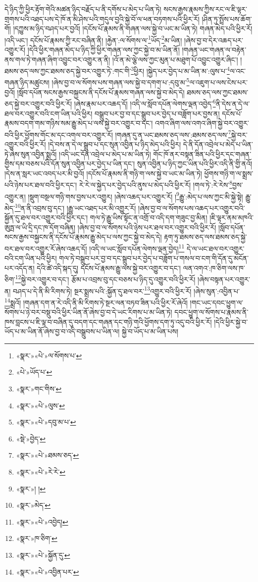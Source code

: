 དེ་ཉིད་ཀྱི་ཕྱིར་རྟོག་གེའི་མཚན་ཉིད་བརྗོད་པ་ནི་དགོས་པ་མེད་པ་ཡིན་ཏེ། སངས་རྒྱས་རྣམས་ཀྱིས་རང་ལ་ཇི་ལྟར་གྲགས་པའི་འཐད་པས་དེ་ཁོ་ན་མི་ཤེས་པའི་གདུལ་བྱའི་སྐྱེ་བོ་ལ་ཕན་བཏགས་པའི་ཕྱིར་རོ། །ཤིན་ཏུ་སྤྲོས་པས་ཆོག་གོ། །དཀྱུས་མ་ཉིད་བཤད་པར་བྱའོ། །དངོས་པོ་རྣམས་ནི་གཞན་ལས་སྐྱེ་བ་ཡང་མ་ཡིན་ཏེ། གཞན་མེད་པའི་ཕྱིར་རོ། །འདི་ཡང་། དངོས་པོ་རྣམས་ཀྱི་རང་བཞིན་ནི། །རྐྱེན་:ལ་སོགས་ལ་\footnote{«སྣར་»«པེ་»ལ་སོགས་པ་}ཡོད་\footnote{«པེ་»ཡོད་པ་}མ་ཡིན། །ཞེས་བྱ་བ་དེར་འཆད་པར་འགྱུར་རོ། །དེའི་ཕྱིར་གཞན་མེད་པ་ཉིད་ཀྱི་ཕྱིར་གཞན་ལས་ཀྱང་སྐྱེ་བ་མ་ཡིན་ནོ། །གཞན་ཡང་གཞན་ལ་བརྟེན་ནས་གལ་ཏེ་གཞན་ཞིག་འབྱུང་བར་འགྱུར་ན་ནི། །འོ་ན་མེ་ལྕེ་ལས་ཀྱང་མུན་པ་མཐུག་པོ་འབྱུང་འགྱུར་ཞིང་། །ཐམས་ཅད་ལས་ཀྱང་ཐམས་ཅད་སྐྱེ་བར་འགྱུར་ཏེ་:གང་གི་\footnote{«སྣར་»གང་གིས་}ཕྱིར། །སྐྱེད་པར་བྱེད་པ་མ་ཡིན་མ་:ལུས་པ་\footnote{«སྣར་»«པེ་»ལུས་}ལ་འང་གཞན་ཉིད་མཚུངས། །ཞེས་བྱ་བ་ལ་སོགས་པས་གཞན་ལས་སྐྱེ་བ་དགག་པ་:དབུ་མ་\footnote{«སྣར་»«པེ་»དབུ་མ་པ་}ལ་འཇུག་པ་ལས་ངེས་པར་བྱའོ། །སློབ་དཔོན་སངས་རྒྱས་བསྐྱངས་ནི་དངོས་པོ་རྣམས་གཞན་ལས་སྐྱེ་བ་མེད་དེ། ཐམས་ཅད་ལས་ཀྱང་ཐམས་ཅད་སྐྱེ་བར་འགྱུར་བའི་ཕྱིར་རོ། །ཞེས་རྣམ་པར་འཆད་དོ། །འདི་ལ་སློབ་དཔོན་ལེགས་ལྡན་འབྱེད་\footnote{«སྡེ་»བྱེད་}ནི་དེས་ན་དེ་ལ་ཐལ་བར་འགྱུར་བའི་ངག་ཡིན་པའི་ཕྱིར། བསྒྲུབ་པར་བྱ་བ་དང་སྒྲུབ་པར་བྱེད་པ་བཟློག་པར་བྱས་ན། དངོས་པོ་རྣམས་བདག་གམ་གཉིས་སམ་རྒྱུ་མེད་པ་ལས་སྐྱེ་བར་འགྱུར་བ་དང་། འགའ་ཞིག་ལས་འགའ་ཞིག་སྐྱེ་བར་འགྱུར་བའི་ཕྱིར་ཕྱོགས་གོང་མ་དང་འགལ་བར་འགྱུར་རོ། །གཞན་དུ་ན་ཡང་ཐམས་ཅད་ལས་:ཐམས་ཅད་ལས་\footnote{«སྣར་»«པེ་»ཐམས་ཅད་}སྐྱེ་བར་འགྱུར་བའི་ཕྱིར་རོ། །དེ་བས་ན་དེ་ལ་སྒྲུབ་པ་དང་སུན་འབྱིན་པ་ཉིད་མེད་པའི་ཕྱིར། དེ་ནི་དོན་འབྲེལ་པ་མེད་པ་ཡིན་ཏེ་ཞེས་སུན་འབྱིན་སྨྲའོ། །འདི་ཡང་དོན་འབྲེལ་པ་མེད་པ་མ་ཡིན་ཏེ། གོང་ཁོ་ནར་བསྟན་ཟིན་པའི་ཕྱིར་དང་གཞན་གྱིས་དམ་བཅས་པའི་དོན་སུན་འབྱིན་པར་བྱེད་པ་ཡིན་དང་། སུན་འབྱིན་པ་ཉིད་ཀྱང་ཡིན་པའི་ཕྱིར་འདི་ནི་གྱི་ནའོ། །དེས་ན་སླར་ཡང་འབད་པར་མི་བྱའོ། །དངོས་པོ་རྣམས་ནི་གཉི་ག་ལས་སྐྱེ་བ་ཡང་མ་ཡིན་ཏེ། ཕྱོགས་གཉི་ག་ལ་སྨྲས་པའི་ཉེས་པར་ཐལ་བའི་ཕྱིར་དང་། རེ་རེ་ལ་སྐྱེད་པར་བྱེད་པའི་ནུས་པ་མེད་པའི་ཕྱིར་རོ། །གལ་ཏེ་:རེ་རེས་\footnote{«སྣར་»«པེ་»རེ་རེ་}བྱས་འགྱུར་ན། །སྡུག་བསྔལ་གཉི་གས་བྱས་པར་འགྱུར། །ཞེས་འཆད་པར་འགྱུར་རོ། །\footnote{«སྣར་»། ། }རྒྱུ་:མེད་པ་ལས་ཀྱང་མི་སྐྱེ་སྟེ། རྒྱུ་མེད་\footnote{«སྣར་»མེད་}ན་ནི་འབྲས་བུ་དང་། །རྒྱུ་ཡང་འཐད་པར་མི་འགྱུར་རོ། །ཞེས་བྱ་བ་ལ་སོགས་པས་འཆད་པར་འགྱུར་བའི་སྐྱོན་དུ་ཐལ་བར་འགྱུར་བའི་ཕྱིར་དང་། གལ་ཏེ་རྒྱུ་ཡིས་སྟོང་ན་འགྲོ་བ་འདི་དག་གཟུང་བྱ་མིན། །ཇི་ལྟར་ནམ་མཁའི་ཨུཏྤ་ལ་ཡི་དྲི་དང་ཁ་དོག་བཞིན། །ཞེས་བྱ་བ་ལ་སོགས་པའི་ཉེས་པར་ཐལ་བར་འགྱུར་བའི་ཕྱིར་རོ། །སློབ་དཔོན་སངས་རྒྱས་བསྐྱངས་ནི་དངོས་པོ་རྣམས་རྒྱུ་མེད་པ་ལས་ཀྱང་སྐྱེ་བ་མེད་དེ། རྟག་ཏུ་ཐམས་ཅད་ལས་ཐམས་ཅད་སྐྱེ་བར་ཐལ་བར་འགྱུར་རོ་ཞེས་འཆད་དོ། །འདི་ལ་ཡང་སློབ་དཔོན་ལེགས་ལྡན་བྱེད།\footnote{«སྣར་»«པེ་»འབྱེད།} དེ་ལ་ཡང་ཐལ་བར་འགྱུར་བའི་ངག་ཡིན་པའི་ཕྱིར། གལ་ཏེ་བསྒྲུབ་པར་བྱ་བ་དང་སྒྲུབ་པར་བྱེད་པ་བཟློག་པ་གསལ་བ་ངག་གི་དོན་དུ་མངོན་པར་འདོད་ན། དེའི་ཚེ་འདི་སྐད་དུ། དངོས་པོ་རྣམས་རྒྱུ་ལས་སྐྱེ་བར་འགྱུར་བ་དང་། ལན་འགའ་:ཁ་ཅིག་ལས་ཁ་ཅིག་\footnote{«སྣར་»ཁ་ཅིག་}སྐྱེ་བར་འགྱུར་བ་དང་། རྩོམ་པ་འབྲས་བུ་དང་བཅས་པ་ཉིད་དུ་འགྱུར་བའི་ཕྱིར་རོ། །ཞེས་བསྟན་པར་འགྱུར་ན། བཤད་པ་དེ་ནི་མི་རིགས་ཏེ། སྔར་སྨྲས་པའི་:སྐྱོན་དུ་ཐལ་བར་\footnote{«སྣར་»«པེ་»སྐྱོན་དུ་}འགྱུར་བའི་ཕྱིར་རོ། །ཞེས་སུན་:འབྱིན་པ་\footnote{«སྣར་»«པེ་»འབྱིན་པར་}སྨྲའོ། །གཞན་དག་ན་རེ་འདི་ནི་མི་རིགས་ཏེ་སྔར་ལན་བཏབ་ཟིན་པའི་ཕྱིར་རོ་ཞེའོ། །གང་ཡང་དབང་ཕྱུག་ལ་སོགས་པ་ཉེ་བར་བསྡུ་བའི་ཕྱིར་ཡིན་ནོ་ཞེས་བྱ་བ་དེ་ཡང་རིགས་པ་མ་ཡིན་ཏེ། དབང་ཕྱུག་ལ་སོགས་པ་རྣམས་ནི་ཁས་བླངས་པ་ཇི་ལྟ་བ་བཞིན་དུ་བདག་དང་གཞན་དང་གཉི་གའི་ཕྱོགས་དག་ཏུ་འདུ་བའི་ཕྱིར་རོ། །དེའི་ཕྱིར་སྐྱེ་བ་ཡོད་པ་མ་ཡིན་ནོ་ཞེས་བྱ་བ་འདི་བསྒྲུབས་པ་ཡིན་ལ། སྐྱེ་བ་ཡོད་པ་མ་ཡིན་པས། 